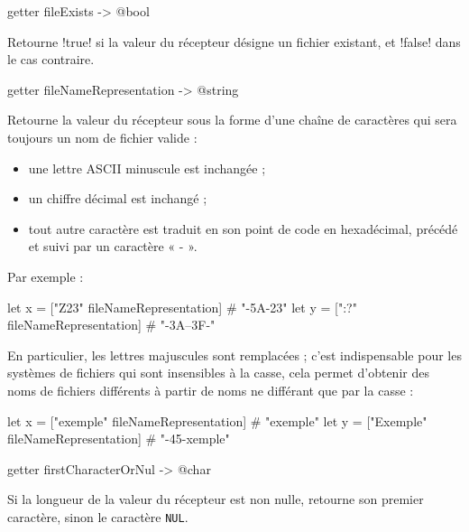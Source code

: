 
\begin{galgasbox}
getter fileExists -> @bool
\end{galgasbox}

Retourne \ggs!true! si la valeur du récepteur désigne un fichier existant, et \ggs!false! dans le cas contraire.







\begin{galgasbox}
getter fileNameRepresentation -> @string
\end{galgasbox}

Retourne la valeur du récepteur sous la forme d'une chaîne de caractères qui sera toujours un nom de fichier valide :
\begin{itemize}
\item une lettre ASCII minuscule est inchangée ;
\item un chiffre décimal est inchangé ;
\item tout autre caractère est traduit en son point de code en hexadécimal, précédé et suivi par un caractère « - ».
\end{itemize}

Par exemple :
\begin{galgas}
let x = ["Z23" fileNameRepresentation] # "-5A-23"
let y = [":?" fileNameRepresentation] # "-3A--3F-"
\end{galgas}

En particulier, les lettres majuscules sont remplacées ; c'est indispensable pour les systèmes de fichiers qui sont insensibles à la casse, cela permet d'obtenir des noms de fichiers différents à partir de noms ne différant que par la casse :

\begin{galgas}
let x = ["exemple" fileNameRepresentation] # "exemple"
let y = ["Exemple" fileNameRepresentation] # "-45-xemple"
\end{galgas}







\begin{galgasbox}
getter firstCharacterOrNul -> @char
\end{galgasbox}

Si la longueur de la valeur du récepteur est non nulle, retourne son premier caractère, sinon le caractère \texttt{NUL}.







